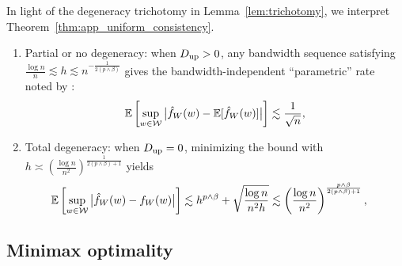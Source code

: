\begin{remark}

  In light of the degeneracy trichotomy
  in Lemma~\ref{lem:trichotomy},
  we interpret Theorem~\ref{thm:app_uniform_consistency}.
  \begin{enumerate}[label=(\roman*)]

    \item Partial or no degeneracy:
      when $D_{\textup{up}} > 0$,
      any bandwidth sequence satisfying
      $\frac{\log n}{n} \lesssim h \lesssim n^{-\frac{1}{2(p \wedge \beta)}}$
      gives the bandwidth-independent ``parametric'' rate noted by
      \citet{graham2022kernel}:
      \begin{align*}
        \mathbb{E}\left[
          \sup_{w \in \mathcal{W}}
          \big|\hat f_W(w) - \mathbb{E}[\hat f_W(w)]\big|
        \right]
        \lesssim
        \frac{1}{\sqrt n},
      \end{align*}

    \item Total degeneracy:
      when $D_{\textup{up}} = 0$,
      minimizing the bound with
      $h \asymp
      \left( \frac{\log n}{n^2} \right)^{\frac{1}{2(p \wedge \beta)+1}}$
      yields
      \begin{align*}
        \mathbb{E}\left[
          \sup_{w \in \mathcal{W}}
          \big|\hat f_W(w) - f_W(w)\big|
        \right]
        &\lesssim
        h^{p \wedge \beta}
        + \sqrt{\frac{\log n}{n^2h}}
        \lesssim
        \left(
          \frac{\log n}{n^2}
        \right)^{\frac{p \wedge \beta}{2(p \wedge \beta)+1}},
      \end{align*}
  \end{enumerate}

\end{remark}

\subsection{Minimax optimality}

